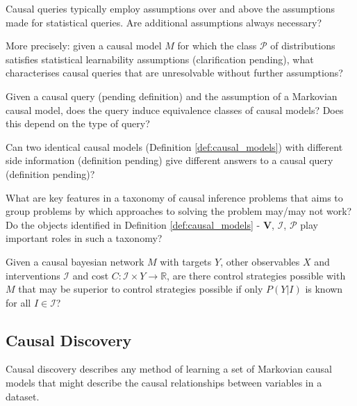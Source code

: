 \begin{question}
    Causal queries typically employ assumptions over and above the assumptions made for statistical queries. Are additional assumptions always necessary?
    
    More precisely: given a causal model $M$ for which the class $\mathcal{P}$ of distributions satisfies statistical learnability assumptions (clarification pending), what characterises causal queries that are unresolvable without further assumptions?
\end{question}

\begin{question}\label{q:query_set_of_models}
    Given a causal query (pending definition) and the assumption of a Markovian causal model, does the query induce equivalence classes of causal models? Does this depend on the type of query?
\end{question}

\begin{question}
    Can two identical causal models (Definition \ref{def:causal_models}) with different side information (definition pending) give different answers to a causal query (definition pending)?
\end{question}

\begin{question}
    What are key features in a taxonomy of causal inference problems that aims to group problems by which approaches to solving the problem may/may not work? Do the objects identified in Definition \ref{def:causal_models} - $\mathbf{V}$, $\mathcal{I}$, $\mathcal{P}$ play important roles in such a taxonomy?
\end{question}

\begin{question}
    Given a causal bayesian network $M$ with targets $Y$, other observables $X$ and interventions $\mathcal{I}$ and cost $C:\mathcal{I}\times Y\to\mathbb{R}$, are there control strategies possible with $M$ that may be superior to control strategies possible if only $P(Y|I)$ is known for all $I\in\mathcal{I}$?
\end{question}

\subsection{Causal Discovery}

Causal discovery describes any method of learning a set of Markovian causal models that might describe the causal relationships between variables in a dataset.

